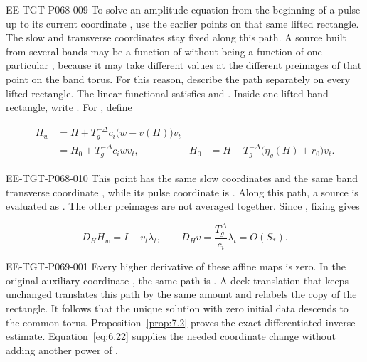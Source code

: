 \begin{EESegment}{EE-TGT-P068-009}
To solve an amplitude equation from the beginning of a pulse up to its current coordinate , use the earlier points on that same lifted rectangle. The slow and transverse coordinates stay fixed along this path. A source built from several bands may be a function of  without being a function of one particular , because it may take different values at the different preimages of that point on the band torus. For this reason, describe the path separately on every lifted rectangle. The linear functional  satisfies  and . Inside one lifted band rectangle, write . For , define
\end{EESegment}
\begin{equation}
  \begin{aligned}
    H_w&=H+T_g^{-\Delta}c_i\bigl(w-v(H)\bigr)v_t\\
       &=H_0+T_g^{-\Delta}c_iwv_t,
       & H_0&=H-T_g^{-\Delta}\bigl(\eta_g(H)+r_0\bigr)v_t.
  \end{aligned}
  \tag{6.21}\label{eq:6.21}
\end{equation}
\begin{EESegment}{EE-TGT-P068-010}
This point has the same slow coordinates and the same band transverse coordinate , while its pulse coordinate is . Along this path, a source  is evaluated as . The other preimages are not averaged together. Since , fixing  gives
\end{EESegment}
\begin{equation}
  D_HH_w=I-v_t\lambda_t,
  \qquad D_Hv=\frac{T_g^\Delta}{c_i}\lambda_t=O(S_*).
  \tag{6.22}\label{eq:6.22}
\end{equation}

%
\begin{EESegment}{EE-TGT-P069-001}
Every higher derivative of these affine maps is zero. In the original auxiliary coordinate , the same path is . A deck translation that keeps  unchanged translates this path by the same amount and relabels the copy of the rectangle. It follows that the unique solution with zero initial data descends to the common torus. Proposition~\ref{prop:7.2} proves the exact differentiated inverse estimate. Equation~\eqref{eq:6.22} supplies the needed coordinate change without adding another power of .
\end{EESegment}

